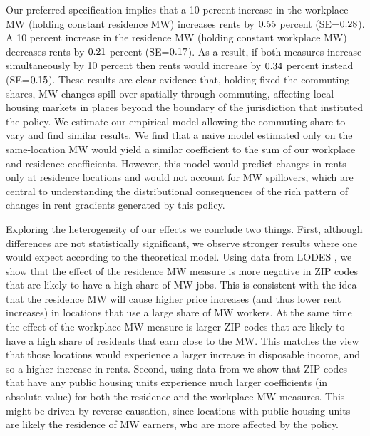 
Our preferred specification implies that 
a 10 percent increase in the workplace MW (holding constant residence MW) 
increases rents by $\textnormal{0.55}$ percent 
(SE=$\textnormal{0.28}$).
A 10 percent increase in the residence MW (holding 
constant workplace MW) decreases rents by $\textnormal{0.21}$ percent 
(SE=$\textnormal{0.17}$). 
As a result, if both measures increase simultaneously by 10 percent then 
rents would increase by $\textnormal{0.34}$ percent instead 
(SE=$\textnormal{0.15}$).
These results are clear evidence that, holding fixed the commuting shares, MW 
changes spill over spatially through commuting, affecting local housing markets 
in places beyond the boundary of the jurisdiction that instituted the policy.
We estimate our empirical model allowing the commuting share to vary and find 
similar results.
We find that a naive model estimated only on the same-location MW would yield a 
similar coefficient to the sum of our workplace and residence coefficients.
However, this model would predict changes in rents only at residence locations 
and would not account for MW spillovers, which are central to understanding the 
distributional consequences of the rich pattern of changes in rent gradients
generated by this policy.

Exploring the heterogeneity of our effects we conclude two things.
First, although differences are not statistically significant, we observe 
stronger results where one would expect according to the theoretical model.
Using data from LODES \parencite{CensusLODES}, we show that the effect of the 
residence MW measure is more negative in ZIP codes that are likely to have a 
high share of MW jobs.
This is consistent with the idea that the residence MW will cause higher price 
increases (and thus lower rent increases) in locations that use a large share 
of MW workers.
At the same time the effect of the workplace MW measure is larger ZIP codes that
are likely to have a high share of residents that earn close to the MW.
This matches the view that those locations would experience a larger increase
in disposable income, and so a higher increase in rents.
Second, using data from \textcite{hudHousing} we show that ZIP codes that have 
any public housing units experience much larger coefficients (in absolute value) 
for both the residence and the workplace MW measures.
This might be driven by reverse causation, since locations with public housing
units are likely the residence of MW earners, who are more affected by the 
policy.

